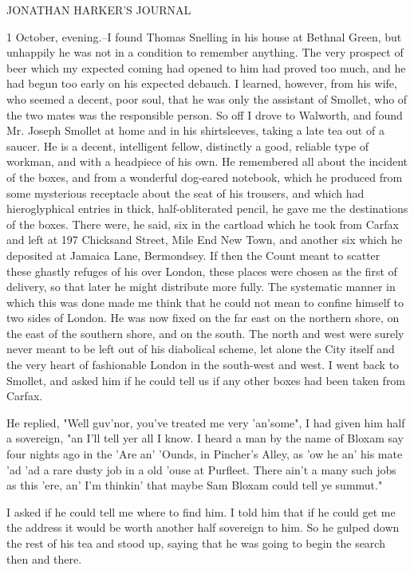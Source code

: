 JONATHAN HARKER'S JOURNAL 

1 October, evening.--I found Thomas Snelling in his house at Bethnal Green, but unhappily he was not in a condition to remember anything. The very prospect of beer which my expected coming had opened to him had proved too much, and he had begun too early on his expected debauch. I learned, however, from his wife, who seemed a decent, poor soul, that he was only the assistant of Smollet, who of the two mates was the responsible person. So off I drove to Walworth, and found Mr. Joseph Smollet at home and in his shirtsleeves, taking a late tea out of a saucer. He is a decent, intelligent fellow, distinctly a good, reliable type of workman, and with a headpiece of his own. He remembered all about the incident of the boxes, and from a wonderful dog-eared notebook, which he produced from some mysterious receptacle about the seat of his trousers, and which had hieroglyphical entries in thick, half-obliterated pencil, he gave me the destinations of the boxes. There were, he said, six in the cartload which he took from Carfax and left at 197 Chicksand Street, Mile End New Town, and another six which he deposited at Jamaica Lane, Bermondsey. If then the Count meant to scatter these ghastly refuges of his over London, these places were chosen as the first of delivery, so that later he might distribute more fully. The systematic manner in which this was done made me think that he could not mean to confine himself to two sides of London. He was now fixed on the far east on the northern shore, on the east of the southern shore, and on the south. The north and west were surely never meant to be left out of his diabolical scheme, let alone the City itself and the very heart of fashionable London in the south-west and west. I went back to Smollet, and asked him if he could tell us if any other boxes had been taken from Carfax. 

He replied, "Well guv'nor, you've treated me very 'an'some", I had given him half a sovereign, "an I'll tell yer all I know. I heard a man by the name of Bloxam say four nights ago in the 'Are an' 'Ounds, in Pincher's Alley, as 'ow he an' his mate 'ad 'ad a rare dusty job in a old 'ouse at Purfleet. There ain't a many such jobs as this 'ere, an' I'm thinkin' that maybe Sam Bloxam could tell ye summut." 

I asked if he could tell me where to find him. I told him that if he could get me the address it would be worth another half sovereign to him. So he gulped down the rest of his tea and stood up, saying that he was going to begin the search then and there. 

